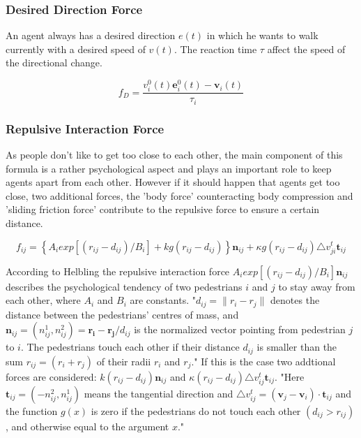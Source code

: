\documentclass[11pt]{article}
\begin{document}
\subsubsection{Desired Direction Force}

An agent always has a desired direction $e(t)$ in which he wants to walk currently with a desired speed of $v(t)$. 
The reaction time $\tau$ affect the speed of the directional change.

\begin{equation}
f_{D}=\frac{v_{i}^{0}(t)\mathbf{e}_{i}^{0}(t)-\mathbf{v}_{i}(t)}{\tau_{i}}
\end{equation}

\subsubsection{Repulsive Interaction Force}

As people don't like to get too close to each other, the main component of this
formula is a rather psychological aspect and plays an important role to keep
agents apart from each other. However if it should happen that agents get too
close, two additional forces, the 'body force' counteracting body compression
and 'sliding friction force' contribute to the repulsive force to ensure a
certain distance. \cite{SDFEP} 

\begin{equation}
f_{ij}=\left\{A_{i}exp[(r_{ij}-d_{ij})/B_{i}]+kg(r_{ij}-d_{ij})\right\}\mathbf{n}_{ij}+\kappa g(r_{ij}-d_{ij})\triangle v_{ji}^t\mathbf{t}_{ij}
\end{equation}

According to Helbling the repulsive interaction force $A_{i}exp[(r_{ij}-d_{ij})/B_{i}]\mathbf{n}_{ij}$ describes the psychological tendency of two pedestrians $i$ and $j$ to stay away from each other, where $A_i$ and $B_i$ are constants. 
"$d_{ij}=\|r_i-r_j\|$ denotes the distance between the pedestrians' centres of mass, and $\mathbf{n}_{ij}=(n_{ij}^1, n_{ij}^2)=\mathbf{r_i}-\mathbf{r_j}/d_{ij}$ is the normalized vector pointing from pedestrian $j$ to $i$.
The pedestrians touch each other if their distance $d_{ij}$ is smaller than the sum $r_{ij}=(r_i+r_j)$ of their radii $r_i$ and $r_j$."\cite{SDFEP}
If this is the case two addtional forces are considered:
$k(r_{ij}-d_{ij})\mathbf{n}_{ij}$ and $\kappa(r_{ij}-d_{ij})\triangle
v_{ij}^t\mathbf{t}_{ij}$. "Here $\mathbf{t}_{ij}=(-n_{ij}^2,n_{ij}^1)$ means
the tangential direction and $\triangle
v_{ij}^t=(\mathbf{v}_j-\mathbf{v}_i)\cdot\mathbf{t}_{ij}$ and the function
$g(x)$ is zero if the pedestrians do not touch each other $(d_{ij}>r_{ij})$,
and otherwise equal to the argument $x$."\cite{SDFEP}
\end{document}
